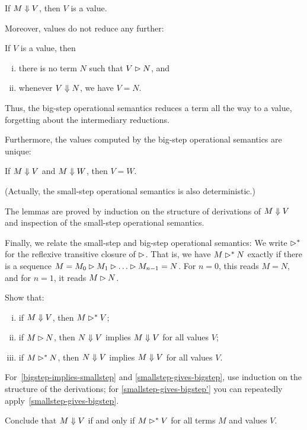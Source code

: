 \begin{lemma}
  If \(M \Downarrow V\), then \(V\) is a value.
\end{lemma}

Moreover, values do not reduce any further:

\begin{lemma}
  If \(V\) is a value, then
  \begin{enumerate}[(i)]
  \item there is no term \(N\) such that \(V \rhd N\), and
  \item whenever \(V \Downarrow N\), we have \(V = N\).
  \end{enumerate}
\end{lemma}

Thus, the big-step operational semantics reduces a term all the way to a value,
forgetting about the intermediary reductions.

Furthermore, the values computed by the big-step operational semantics are
unique:
\begin{lemma}
  If \(M \Downarrow V\) and \(M \Downarrow W\), then \(V = W\).
\end{lemma}

(Actually, the small-step operational semantics is also deterministic.)

The lemmas are proved by induction on the structure of derivations of
\(M \Downarrow V\) and inspection of the small-step operational semantics.

Finally, we relate the small-step and big-step operational semantics:
%
We write \(\rhd^\ast\) for the reflexive transitive closure of
\(\rhd\). That is, we have \(M \rhd^\ast N\) exactly if there is a
sequence \(M = M_0 \smallstep M_1 \smallstep \dots \smallstep M_{n-1} = N\). For
\(n = 0\), this reads \(M = N\), and for \(n = 1\), it reads \(M \rhd N\).

\begin{exercise}\label{exer:small-and-big-step}
  Show that:
  \begin{enumerate}[(i)]
  \item\label{bigstep-implies-smallstep} if \(M \Downarrow V\), then \(M \rhd^\ast V\);
  \item\label{smallstep-gives-bigstep} if \(M \rhd N\), then
    \(N \Downarrow V\) implies \(M \Downarrow V\) for all values \(V\);
  \item\label{smallstep-gives-bigstep'} if \(M \rhd^\ast N\), then
    \(N \Downarrow V\) implies \(M \Downarrow V\) for all values \(V\).
  \end{enumerate}
  For~\ref{bigstep-implies-smallstep} and \ref{smallstep-gives-bigstep}, use
  induction on the structure of the derivations; for
  \ref{smallstep-gives-bigstep'} you can repeatedly
  apply~\ref{smallstep-gives-bigstep}.

  Conclude that \(M \Downarrow V\) if and only if \(M \rhd^\ast V\) for all
  terms \(M\) and values \(V\).
\end{exercise}


